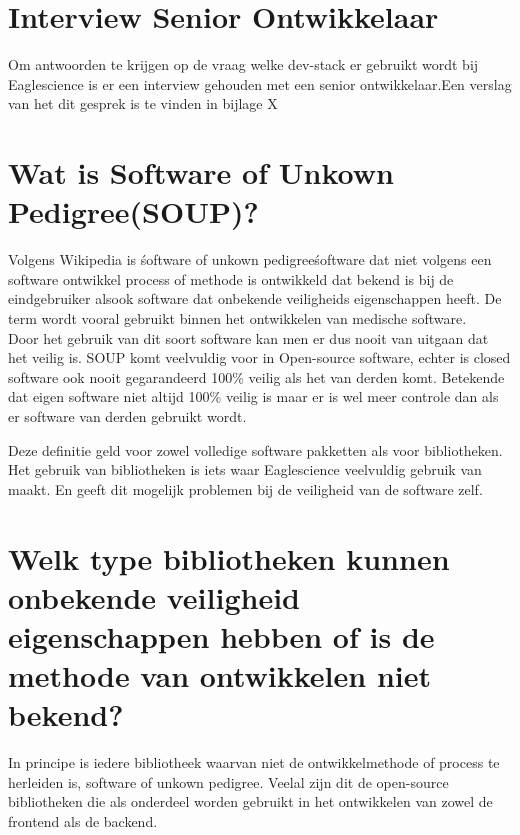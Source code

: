 \section{Interview Senior Ontwikkelaar}
Om antwoorden te krijgen op de vraag welke dev-stack er gebruikt wordt bij Eaglescience is er een interview gehouden met een senior ontwikkelaar.Een verslag van het dit gesprek is te vinden in bijlage X%



\section{Wat is Software of Unkown Pedigree(SOUP)?}
Volgens Wikipedia is \'software of unkown pedigree\' software dat niet volgens een software ontwikkel process of methode is ontwikkeld dat bekend is bij de eindgebruiker alsook software dat onbekende veiligheids eigenschappen heeft. De term wordt vooral gebruikt binnen het ontwikkelen van medische software.\\  %
Door het gebruik van dit soort software kan men er dus nooit van uitgaan dat het veilig is.  SOUP komt veelvuldig voor in Open-source software, echter is closed software ook nooit gegarandeerd 100\% veilig als het van derden komt. Betekende dat eigen software niet altijd 100\% veilig is maar er is wel meer controle dan als er software van derden gebruikt wordt.

Deze definitie geld voor zowel volledige software pakketten als voor bibliotheken. Het gebruik van bibliotheken is iets waar Eaglescience veelvuldig gebruik van maakt. En geeft dit mogelijk problemen bij de veiligheid van de software zelf.

\section{Welk type bibliotheken kunnen onbekende veiligheid eigenschappen hebben of is de methode van ontwikkelen niet bekend?}
In principe is iedere bibliotheek waarvan niet de ontwikkelmethode of process te herleiden is, software of unkown pedigree. Veelal zijn dit de open-source bibliotheken die als onderdeel worden gebruikt in het ontwikkelen van zowel de frontend als de backend.

